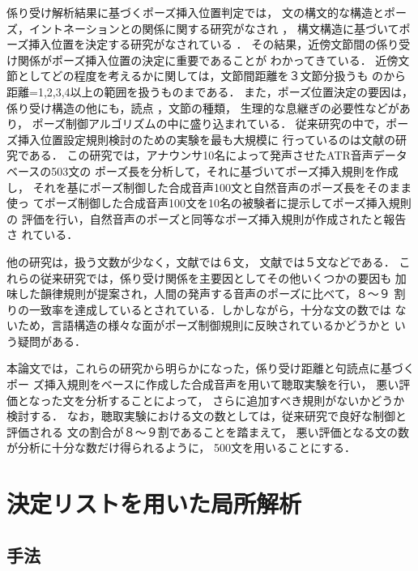 係り受け解析結果に基づくポーズ挿入位置判定では，
文の構文的な構造とポーズ，イントネーションとの関係に関する研究がなされ
\cite{杉藤1997,杉藤1989a}，
構文構造に基づいてポーズ挿入位置を決定する研究がなされている
\cite{匂坂1993,海木1996,佐藤1999,清水1999}．
その結果，近傍文節間の係り受け関係がポーズ挿入位置の決定に重要であることが
わかってきている．
近傍文節としてどの程度を考えるかに関しては，文節間距離を３文節分扱うも
の\cite{鈴木1995}から
距離=1,2,3,4以上の範囲を扱うもの\cite{佐藤1999}まである．
また，ポーズ位置決定の要因は，係り受け構造の他にも，読点
\cite{海木1996}，文節の種類\cite{清水1999}，
生理的な息継ぎの必要性\cite{杉藤1989b}などがあり，
ポーズ制御アルゴリズムの中に盛り込まれている．
従来研究の中で，ポーズ挿入位置設定規則検討のための実験を最も大規模に
行っているのは文献\cite{海木1996}の研究である．
この研究では，アナウンサ10名によって発声させたATR音声データベースの503文の
ポーズ長を分析して，それに基づいてポーズ挿入規則を作成し，
それを基にポーズ制御した合成音声100文と自然音声のポーズ長をそのまま使っ
てポーズ制御した合成音声100文を10名の被験者に提示してポーズ挿入規則の
評価を行い，自然音声のポーズと同等なポーズ挿入規則が作成されたと報告さ
れている．

他の研究は，扱う文数が少なく，文献\cite{鈴木1995}では６文，
文献\cite{河井1994}では５文などである．
これらの従来研究では，係り受け関係を主要因としてその他いくつかの要因も
加味した韻律規則が提案され，人間の発声する音声のポーズに比べて，８〜９
割りの一致率を達成しているとされている．しかしながら，十分な文の数では
ないため，言語構造の様々な面がポーズ制御規則に反映されているかどうかと
いう疑問がある．

本論文では，これらの研究から明らかになった，係り受け距離と句読点に基づくポー
ズ挿入規則をベースに作成した合成音声を用いて聴取実験を行い，
悪い評価となった文を分析することによって，
さらに追加すべき規則がないかどうか検討する．
なお，聴取実験における文の数としては，従来研究で良好な制御と評価される
文の割合が８〜９割であることを踏まえて，
悪い評価となる文の数が分析に十分な数だけ得られるように，
500文を用いることにする．


\section{決定リストを用いた局所解析}
\label{決定リストを用いた局所解析}

\subsection{手法}
\label{手法}

